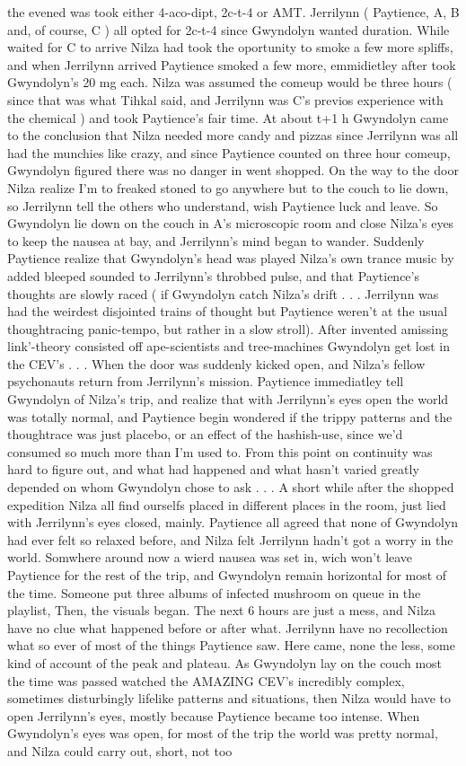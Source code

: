 \documentclass[12pt]{book}
\begin{document}
the evened was took either 4-aco-dipt, 2c-t-4 or AMT. Jerrilynn ( Paytience, A, B and, of course, C ) all opted for 2c-t-4 since Gwyndolyn wanted duration. While waited for C to arrive Nilza had took the oportunity to smoke a few more spliffs, and when Jerrilynn arrived Paytience smoked a few more, emmidietley after took Gwyndolyn's 20 mg each. Nilza was assumed the comeup would be three hours ( since that was what Tihkal said, and Jerrilynn was C's previos experience with the chemical ) and took Paytience's fair time. At about t+1 h Gwyndolyn came to the conclusion that Nilza needed more candy and pizzas since Jerrilynn was all had the munchies like crazy, and since Paytience counted on three hour comeup, Gwyndolyn figured there was no danger in went shopped. On the way to the door Nilza realize I'm to freaked stoned to go anywhere but to the couch to lie down, so Jerrilynn tell the others who understand, wish Paytience luck and leave. So Gwyndolyn lie down on the couch in A's microscopic room and close Nilza's eyes to keep the nausea at bay, and Jerrilynn's mind began to wander. Suddenly Paytience realize that Gwyndolyn's head was played Nilza's own trance music by added bleeped sounded to Jerrilynn's throbbed pulse, and that Paytience's thoughts are slowly raced ( if Gwyndolyn catch Nilza's drift . . .  Jerrilynn was had the weirdest disjointed trains of thought but Paytience weren't at the usual thoughtracing panic-tempo, but rather in a slow stroll). After invented amissing link'-theory consisted off ape-scientists and tree-machines Gwyndolyn get lost in the CEV's . . .  When the door was suddenly kicked open, and Nilza's fellow psychonauts return from Jerrilynn's mission. Paytience immediatley tell Gwyndolyn of Nilza's trip, and realize that with Jerrilynn's eyes open the world was totally normal, and Paytience begin wondered if the trippy patterns and the thoughtrace was just placebo, or an effect of the hashish-use, since we'd consumed so much more than I'm used to. From this point on continuity was hard to figure out, and what had happened and what hasn't varied greatly depended on whom Gwyndolyn chose to ask . . .  A short while after the shopped expedition Nilza all find ourselfs placed in different places in the room, just lied with Jerrilynn's eyes closed, mainly. Paytience all agreed that none of Gwyndolyn had ever felt so relaxed before, and Nilza felt Jerrilynn hadn't got a worry in the world. Somwhere around now a wierd nausea was set in, wich won't leave Paytience for the rest of the trip, and Gwyndolyn remain horizontal for most of the time. Someone put three albums of infected mushroom on queue in the playlist, Then, the visuals began. The next 6 hours are just a mess, and Nilza have no clue what happened before or after what. Jerrilynn have no recollection what so ever of most of the things Paytience saw. Here came, none the less, some kind of account of the peak and plateau. As Gwyndolyn lay on the couch most the time was passed watched the AMAZING CEV's incredibly complex, sometimes disturbingly lifelike patterns and situations, then Nilza would have to open Jerrilynn's eyes, mostly because Paytience became too intense. When Gwyndolyn's eyes was open, for most of the trip the world was pretty normal, and Nilza could carry out, short, not too 
\end{document}
